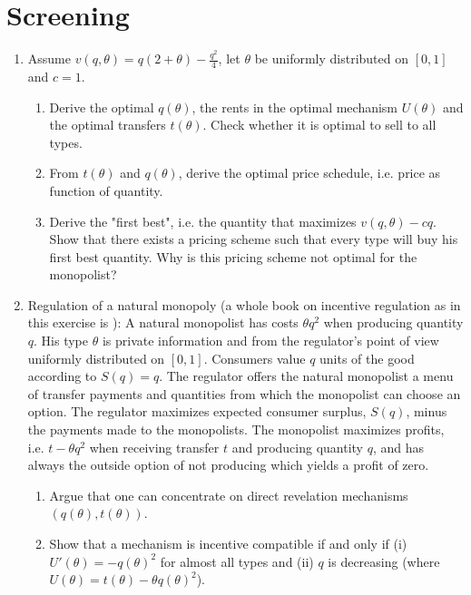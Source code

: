 \documentclass[a4paper,12pt]{article}
\begin{document}
\section{Screening}
\label{sec:screening}

\begin{enumerate}
\item Assume $v(q,\theta)=q(2+\theta)-\frac{q^{2}}{4}$, let $\theta$ be uniformly distributed on $[0,1]$ and $c=1$.
  \begin{enumerate}
  \item Derive the optimal $q(\theta)$, the rents in the optimal
    mechanism $U(\theta)$ and the optimal transfers $t(\theta)$. Check
    whether it is optimal to sell to all types.
   \item From $t(\theta)$ and $q(\theta)$, derive the optimal price schedule, i.e. price as function of quantity.
   \item Derive the "first best", i.e. the quantity that maximizes
    $v(q,\theta)-c q$. Show that there exists a pricing scheme such that
    every type will buy his first best quantity. Why is this pricing
    scheme not optimal for the monopolist?
\end{enumerate}
\item Regulation of a natural monopoly (a whole book on incentive regulation as in this exercise is \cite{laffont1993theory}): A natural monopolist has costs $\theta q^2$ when producing quantity $q$. His type $\theta $ is private information and from the regulator's point of view uniformly distributed on $[0,1]$. Consumers value $q$ units of the good according to $S(q)=q$. The regulator offers the natural monopolist a menu of transfer payments and quantities from which the monopolist can choose an option. The regulator maximizes expected consumer surplus, $S(q)$, minus the payments made to the monopolists. The monopolist maximizes profits, i.e. $t-\theta  q^2$ when receiving transfer $t$ and producing quantity $q$, and has always the outside option of not producing which yields a profit of zero.
  \begin{enumerate}
  \item Argue that one can concentrate on direct revelation mechanisms $(q(\theta ),t(\theta ))$.
  \item Show that a mechanism is incentive compatible if and only if (i) $U'(\theta )=-q(\theta )^2$ for almost all types and (ii) $q$ is decreasing (where $U(\theta )=t(\theta )-\theta q(\theta )^2$).

\end{enumerate}
\end{enumerate}
\end{document}

